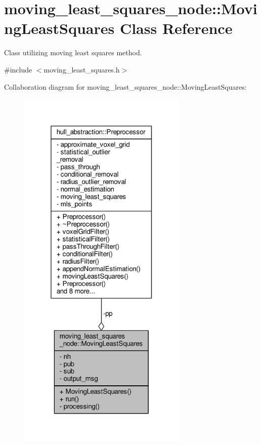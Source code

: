 \hypertarget{classmoving__least__squares__node_1_1_moving_least_squares}{}\section{moving\+\_\+least\+\_\+squares\+\_\+node\+:\+:Moving\+Least\+Squares Class Reference}
\label{classmoving__least__squares__node_1_1_moving_least_squares}


Class utilizing moving least squares method.  




{\ttfamily \#include $<$moving\+\_\+least\+\_\+squares.\+h$>$}



Collaboration diagram for moving\+\_\+least\+\_\+squares\+\_\+node\+:\+:Moving\+Least\+Squares\+:\nopagebreak
\begin{figure}[H]
\begin{center}
\leavevmode
\includegraphics[width=229pt]{classmoving__least__squares__node_1_1_moving_least_squares__coll__graph}
\end{center}
\end{figure}
